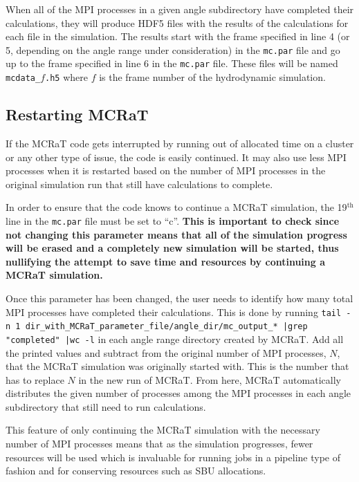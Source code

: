 \documentclass[12pt,a4paper]{article}
\begin{document}
 When all of the MPI processes in a given angle subdirectory have completed their calculations, they will produce HDF5 files with the results of the calculations for each file in the simulation. The results start with the frame specified in line 4 (or 5, depending on the angle range under consideration) in the \texttt{mc.par} file and go up to the frame specified in line 6 in the \texttt{mc.par} file. These files will be named \texttt{mcdata\_$f$.h5} where $f$ is the frame number of the hydrodynamic simulation.
 
 \subsection{Restarting MCRaT}
 If the MCRaT code gets interrupted by running out of allocated time on a cluster or any other type of issue, the code is easily continued. It may also use less MPI processes when it is restarted based on the number of MPI processes in the original simulation run that still have calculations to complete. 
 
 In order to ensure that the code knows to continue a MCRaT simulation, the 19$^\textrm{th}$ line in the \texttt{mc.par} file must be set to ``c''. {\bf This is important to check since not changing this parameter means that all of the simulation progress will be erased and a completely new simulation will be started, thus nullifying the attempt to save time and resources by continuing a MCRaT simulation.} 
 
 Once this parameter has been changed, the user needs to identify how many total MPI processes have completed their calculations. This is done by running \texttt{tail -n 1 dir\_with\_MCRaT\_parameter\_file/angle\_dir/mc\_output\_* |grep "completed" |wc -l} in each angle range directory created by MCRaT. Add all the printed values and subtract from the original number of MPI processes, $N$, that the MCRaT simulation was originally started with. This is the number that has to replace $N$ in the new run of MCRaT. From here, MCRaT automatically distributes the given number of processes among the MPI processes in each angle subdirectory that still need to run calculations.
 
 This feature of only continuing the MCRaT simulation with the necessary number of MPI processes means that as the simulation progresses, fewer resources will be used which is invaluable for running jobs in a pipeline type of fashion and for conserving resources such as SBU allocations.
 
\end{document}
